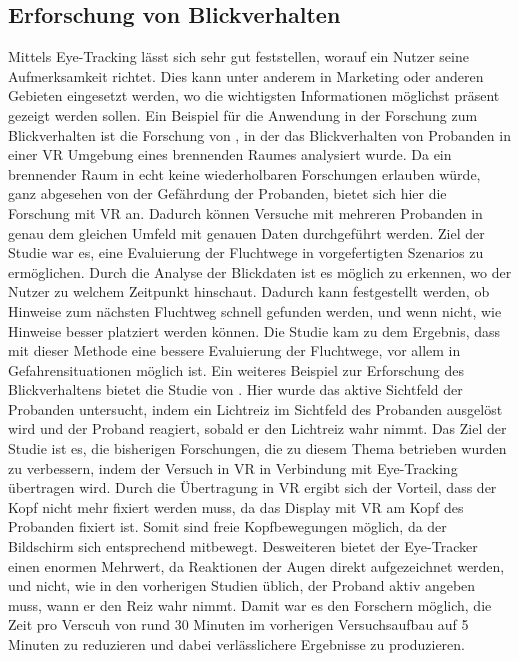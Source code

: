 \subsection{Erforschung von Blickverhalten}
Mittels Eye-Tracking lässt sich sehr gut feststellen, worauf ein Nutzer seine Aufmerksamkeit richtet. Dies kann unter anderem in Marketing\cite{C.Wang.2019} oder anderen Gebieten eingesetzt werden, wo die wichtigsten Informationen möglichst präsent gezeigt werden sollen. 
Ein Beispiel für die Anwendung in der Forschung zum Blickverhalten ist die Forschung von \citeauthor{P.Tian.2019}, in der das Blickverhalten von Probanden in einer VR Umgebung eines brennenden Raumes analysiert wurde. Da ein brennender Raum in echt keine wiederholbaren Forschungen erlauben würde, ganz abgesehen von der Gefährdung der Probanden, bietet sich hier die Forschung mit VR an. Dadurch können Versuche mit mehreren Probanden in genau dem gleichen Umfeld mit genauen Daten durchgeführt werden. Ziel der Studie war es, eine Evaluierung der Fluchtwege in vorgefertigten Szenarios zu ermöglichen. Durch die Analyse der Blickdaten ist es möglich zu erkennen, wo der Nutzer zu welchem Zeitpunkt hinschaut. Dadurch kann festgestellt werden, ob Hinweise zum nächsten Fluchtweg schnell gefunden werden, und wenn nicht, wie Hinweise besser platziert werden können. Die Studie kam zu dem Ergebnis, dass mit dieser Methode eine bessere Evaluierung der Fluchtwege, vor allem in Gefahrensituationen möglich ist\cite{P.Tian.2019}.
Ein weiteres Beispiel zur Erforschung des Blickverhaltens bietet die Studie von \citeauthor{K.Hotta.2019}. Hier wurde das aktive Sichtfeld der Probanden untersucht, indem ein Lichtreiz im Sichtfeld des Probanden ausgelöst wird und der Proband reagiert, sobald er den Lichtreiz wahr nimmt. Das Ziel der Studie ist es, die bisherigen Forschungen, die zu diesem Thema betrieben wurden zu verbessern, indem der Versuch in VR in Verbindung mit Eye-Tracking übertragen wird. Durch die Übertragung in VR ergibt sich der Vorteil, dass der Kopf nicht mehr fixiert werden muss, da das Display mit VR am Kopf des Probanden fixiert ist. Somit sind freie Kopfbewegungen möglich, da der Bildschirm sich entsprechend mitbewegt. Desweiteren bietet der Eye-Tracker einen enormen Mehrwert, da Reaktionen der Augen direkt aufgezeichnet werden, und nicht, wie in den vorherigen Studien üblich, der Proband aktiv angeben muss, wann er den Reiz wahr nimmt. Damit war es den Forschern möglich, die Zeit pro Verscuh von rund 30 Minuten im vorherigen Versuchsaufbau auf 5 Minuten zu reduzieren und dabei verlässlichere Ergebnisse zu produzieren\cite{K.Hotta.2019}. 

